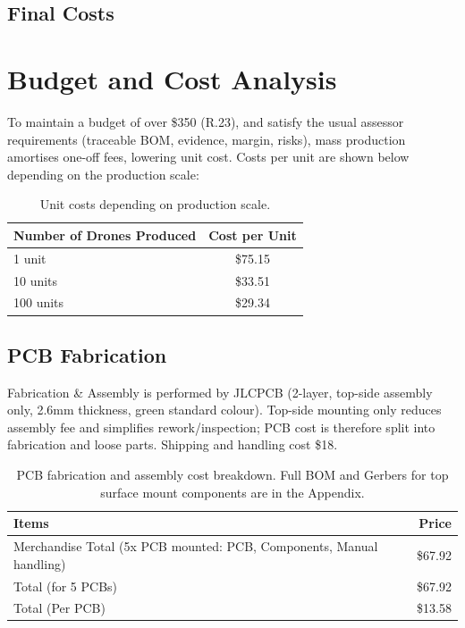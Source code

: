 \subsection{Final Costs}
\section{Budget and Cost Analysis}

To maintain a budget of over \$350 (R.23), and satisfy the usual assessor requirements (traceable BOM, evidence, margin, risks), mass production amortises one-off fees, lowering unit cost. Costs per unit are shown below depending on the production scale:

\begin{table}[H]
\centering
\begin{tabular}{l c}
\toprule
\textbf{Number of Drones Produced} & \textbf{Cost per Unit} \\
\midrule
1 unit   & \$75.15 \\
10 units & \$33.51 \\
100 units & \$29.34 \\
\bottomrule
\end{tabular}
\caption{Unit costs depending on production scale.}
\end{table}

\subsection{PCB Fabrication}

Fabrication \& Assembly is performed by JLCPCB (2-layer, top-side assembly only, 2.6mm thickness, green standard colour). Top-side mounting only reduces assembly fee and simplifies rework/inspection; PCB cost is therefore split into fabrication and loose parts. Shipping and handling cost \$18.

\begin{table}[H]
\centering
\begin{tabular}{l r}
\toprule
\textbf{Items} & \textbf{Price} \\
\midrule
Merchandise Total (5x PCB mounted: PCB, Components, Manual handling) & \$67.92 \\
Total (for 5 PCBs) & \$67.92 \\
Total (Per PCB) & \$13.58 \\
\bottomrule
\end{tabular}
\caption{PCB fabrication and assembly cost breakdown. Full BOM and Gerbers for top surface mount components are in the Appendix.}
\end{table}

